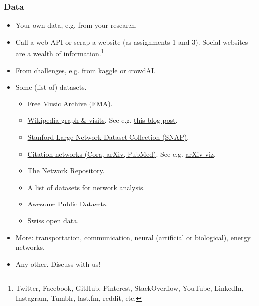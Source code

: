 \documentclass{beamer}
\begin{document}
\begin{frame}
	\frametitle{Data}
	\begin{itemize}
		\small
		\item Your own data, e.g. from your research.
		\vfill
		\item Call a web API or scrap a website (as assignments 1 and 3).
			Social websites are a wealth of information.\footnote{
			Twitter, Facebook, GitHub, Pinterest, StackOverflow,
			YouTube, LinkedIn, Instagram, Tumblr, last.fm, reddit, etc.}
		\vfill
		\item From challenges, e.g. from \href{https://www.kaggle.com/}{kaggle} or \href{https://www.crowdai.org/}{crowdAI}.
		\vfill
		\item Some (list of) datasets.
			\begin{itemize}
				\scriptsize
				\item \href{https://github.com/mdeff/fma}{Free Music Archive (FMA)}.
				\item \href{https://doi.org/10.5281/zenodo.886484}{Wikipedia graph \& visits}. See e.g. \href{http://blog.miz.space/research/2017/08/14/wikipedia-collective-memory-dynamic-graph-analysis-graphx-spark-scala-time-series-network/}{this blog post}.
				\item \href{http://snap.stanford.edu/data/index.html}{Stanford Large Network Dataset Collection (SNAP)}.
				\item \href{https://linqs.soe.ucsc.edu/node/236}{Citation networks (Cora, arXiv, PubMed)}. See e.g. \href{http://paperscape.org/}{arXiv viz}.
				\item The \href{http://networkrepository.com}{Network Repository}.
				\item \href{https://github.com/briatte/awesome-network-analysis\#datasets}{A list of datasets for network analysis}.
				\item \href{https://github.com/caesar0301/awesome-public-datasets}{Awesome Public Datasets}.
				\item \href{https://opendata.swiss/en/}{Swiss open data}.
			\end{itemize}
		\vfill
		\item More: transportation, communication, neural (artificial or biological), energy networks.
		\item Any other. Discuss with us!
	\end{itemize}
\end{frame}

\end{document}
